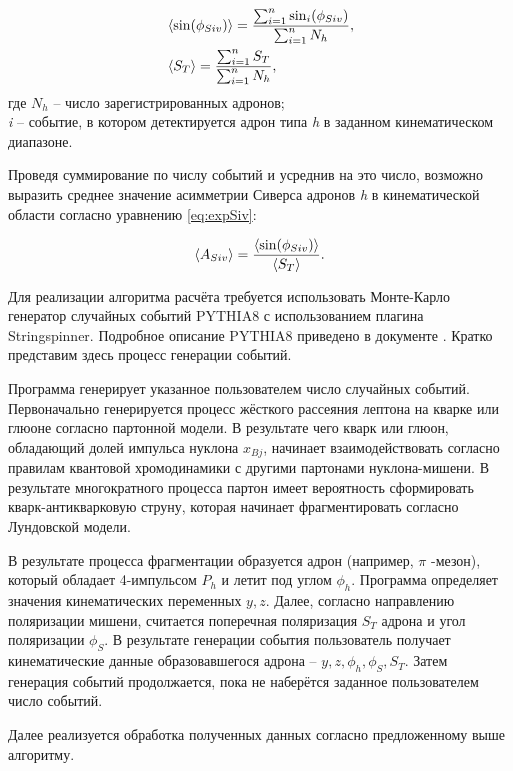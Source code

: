 \documentclass{extreport}
\begin{document}
\begin{equation}
	\begin{split}
		& \braket{\sin (\phi_{Siv})} = \frac{\sum_{i=1}^{n}\sin_i (\phi_{Siv})}{\sum_{i=1}^{n} N_h}, \\
		& \braket{S_T} = \frac{\sum_{i=1}^{n}S_T}{\sum_{i=1}^{n} N_h},
	\end{split}
\end{equation}
где $N_h$ -- число зарегистрированных адронов; \\ \textit{i} -- событие, в котором детектируется адрон типа \textit{h} в заданном кинематическом диапазоне.

Проведя суммирование по числу событий и усреднив на это число, возможно выразить среднее значение асимметрии Сиверса адронов \textit{h} в кинематической области согласно уравнению \ref{eq:expSiv}:

\begin{equation}
	\braket{A_{Siv}} = \frac{\braket{\sin (\phi_{Siv})}}{\braket{S_T}}.
\end{equation}

Для реализации алгоритма расчёта требуется использовать Монте-Карло генератор случайных событий PYTHIA8 с использованием плагина Stringspinner. Подробное описание PYTHIA8 приведено в документе \cite{Bierlich_2022}. Кратко представим здесь процесс генерации событий.

Программа генерирует указанное пользователем число случайных событий. Первоначально генерируется процесс жёсткого рассеяния лептона на кварке или глюоне согласно партонной модели. В результате чего кварк или глюон, обладающий долей импульса нуклона $x_{Bj}$, начинает взаимодействовать согласно правилам квантовой хромодинамики с другими партонами нуклона-мишени. В результате многократного процесса партон имеет вероятность сформировать кварк-антикварковую струну, которая начинает фрагментировать согласно Лундовской модели. 

В результате процесса фрагментации образуется адрон (например, $\pi$ -мезон), который обладает 4-импульсом $P_{h}$ и летит под углом $\phi_h$. Программа определяет значения кинематических переменных $y, z$. Далее, согласно направлению поляризации мишени, считается поперечная поляризация $S_T$ адрона и угол поляризации $\phi_S$. В результате генерации события пользователь получает кинематические данные образовавшегося адрона -- $y, z, \phi_h, \phi_S, S_T$. Затем генерация событий продолжается, пока не наберётся заданное пользователем число событий.

Далее реализуется обработка полученных данных согласно предложенному выше алгоритму. 
\end{document}
